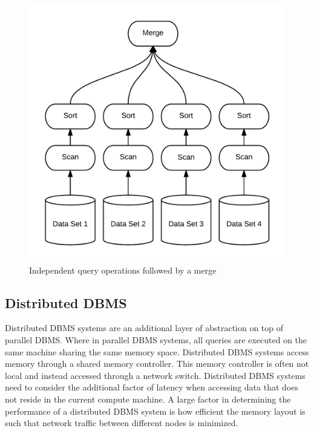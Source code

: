 \documentclass[10pt,twocolumn]{IEEEtran11}
\begin{document}
\begin{figure}[h]
\centering
\includegraphics[scale=0.12]{images/parDBMS.png}
\caption{Independent query operations followed by a merge}
\label{fig:disDBMS}
\end{figure}

\subsection{Distributed DBMS}

Distributed DBMS systems are an additional layer of abstraction on top of parallel DBMS.  Where in parallel DBMS systems, all queries are executed on the same machine sharing the same memory space.  Distributed DBMS systems access memory through a shared memory controller.  This memory controller is often not local and instead accessed through a network switch.  Distributed DBMS systems need to consider the additional factor of latency when accessing data that does not reside in the current compute machine.  A large factor in determining the performance of a distributed DBMS system is how efficient the memory layout is such that network traffic between different nodes is minimized. 
\end{document}
